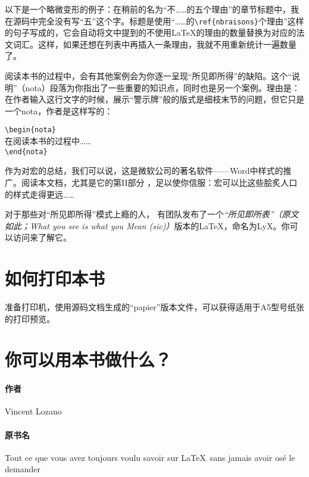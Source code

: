 以下是一个略微变形的例子：在稍前的名为“不……的五个理由”的章节标题中，我在源码中完全没有写“五”这个字。标题是使用“……的\texttt{\backslash ref\{nbraisons\}}个理由”这样的句子写成的，它会自动将文中提到的不使用\LaTeX 的理由的数量替换为对应的法文词汇。这样，如果还想在列表中再插入一条理由，我就不用重新统计一遍数量了。

\begin{exclamation}
    阅读本书的过程中，会有其他案例会为你逐一呈现“所见即所得”的缺陷。这个“说明”（nota）段落为你指出了一些重要的知识点，同时也是另一个案例。理由是：在作者输入这行文字的时候，展示“警示牌”般的版式是细枝末节的问题，但它只是一个nota，作者是这样写的：

    \begin{dmd}
\verb+\begin{nota}+\\
  在阅读本书的过程中……\\
\verb+\end{nota}+
    \end{dmd}
\end{exclamation}

作为对宏的总结，我们可以说，这是微软公司的著名软件——Word中样式的推广。阅读本文档，尤其是它的第II部分%
，足以使你信服：宏可以比这些脍炙人口的样式走得更远……

对于那些对“所见即所得”模式上瘾的人， 有团队发布了一个\textit{“所见即所表”（原文如此；What you see is what you Mean (sic)）}版本的\LaTeX ，命名为LyX。你可以访问来了解它。

\section*{如何打印本书}

准备打印机，使用源码文档生成的“papier”版本文件，可以获得适用于A5型号纸张的打印预览。

\section*{你可以用本书做什么？}

\paragraph*{作者}Vincent Lozano
\paragraph*{原书名}Tout ce que vous avez toujours voulu savoir sur \LaTeX \ sans jamais avoir osé le demander
